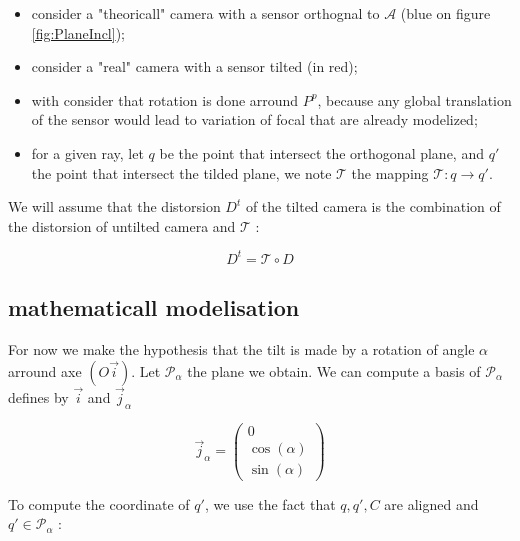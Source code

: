 \begin{itemize}
    \item consider a "theoricall" camera with a sensor orthognal to $\mathcal{A}$ (blue on figure \ref{fig:PlaneIncl});

    \item consider a "real" camera with a sensor tilted (in red);

    \item with consider that rotation is done arround $P^p$, because any global translation of the sensor
         would lead to variation of focal that are already modelized;

    \item  for a given ray, let $q$  be the point that intersect the  orthogonal plane,
	    and $q'$ the point that intersect the tilded  plane, we note
           $\mathcal{T}$  the mapping $\mathcal{T} : q \rightarrow q'$.

\end{itemize}

We will assume that the distorsion $D^t$ of the tilted camera is the combination
of the distorsion of untilted camera and $\mathcal{T}$ :

\begin{equation}
	D^t = \mathcal{T} \circ D 
\end{equation}


\subsection{mathematicall modelisation}

For now we make the hypothesis that the tilt is made by a rotation of angle $\alpha$ arround axe $(O\vec{i})$.
Let $\mathcal{P}_\alpha$ the plane we obtain.  We can compute a basis  of $\mathcal{P}_\alpha$ defines
by  $\vec{i} $ and  $\vec{j}_\alpha $


\begin{equation}
	\vec{j}_\alpha = \begin{pmatrix} 0 \\ \cos(\alpha) \\ \sin(\alpha)  \end{pmatrix}
\end{equation}

To compute the coordinate of $q'$, we use the fact that $q,q',C$ are aligned and $q' \in \mathcal{P}_\alpha$ :

